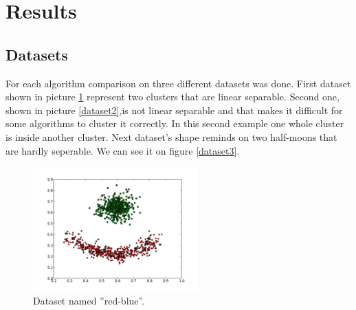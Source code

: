 \documentclass[conference]{IEEEtran}
\begin{document}

\section{Results}

\subsection{Datasets}

For each algorithm comparison on three different datasets was done. First dataset shown in picture \ref{dataset1}
represent two clusters that are linear separable. Second one, shown in picture \ref{dataset2},is not linear separable
and that makes it difficult for some algorithms to cluster it correctly. In this second example one
whole cluster is inside another cluster. Next dataset's shape reminds on two half-moons that are hardly seperable.
We can see it on figure \ref{dataset3}.

\begin{figure}[th]
\centering
\includegraphics[width=15pc]{red-blue-clusters.pdf}
\caption{Dataset named ''red-blue''.}
\label{dataset1}
\end{figure}
\end{document}
